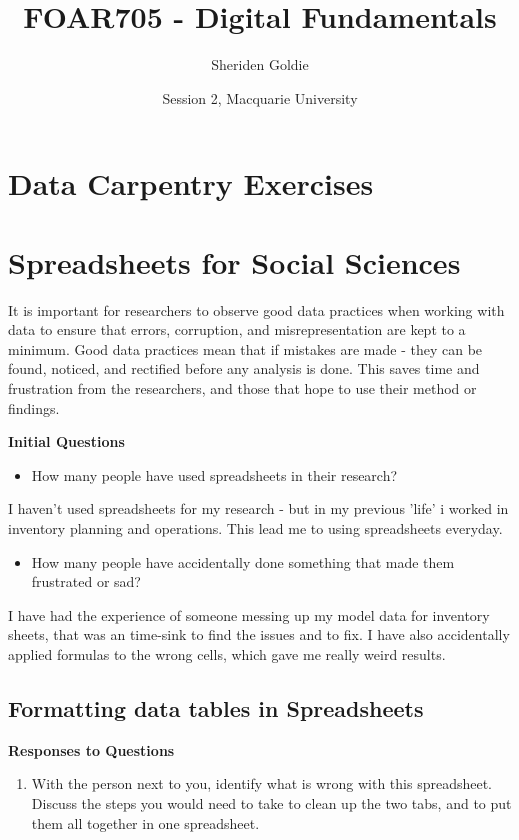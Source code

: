 \documentclass{article}
\title{FOAR705 - Digital Fundamentals}
\author{Sheriden Goldie}
\date{Session 2, Macquarie University}
\begin{document}
\maketitle

\section*{Data Carpentry Exercises}
\tableofcontents
\pagebreak

\section{Spreadsheets for Social Sciences}

It is important for researchers to observe good data practices when working with data to ensure that errors, corruption, and misrepresentation are kept to a minimum. 
Good data practices mean that if mistakes are made - they can be found, noticed, and rectified before any analysis is done. This saves time and frustration from the researchers, and those that hope to use their method or findings. 

\textbf{Initial Questions}
\begin{itemize}
    \item How many people have used spreadsheets in their research?
\end{itemize}

I haven't used spreadsheets for my research - but in my previous 'life' i worked in inventory planning and operations. This lead me to using spreadsheets everyday.

\begin{itemize}
    \item How many people have accidentally done something that made them frustrated or sad?
\end{itemize}

I have had the experience of someone messing up my model data for inventory sheets, that was an time-sink to find the issues and to fix. I have also accidentally applied formulas to the wrong cells, which gave me really weird results. 

\subsection{Formatting data tables in Spreadsheets}

\textbf{Responses to Questions}

\begin{enumerate}
    \item With the person next to you, identify what is wrong with this spreadsheet. Discuss the steps you would need to take to clean up the two tabs, and to put them all together in one spreadsheet.
\end{enumerate} 
\end{document}
